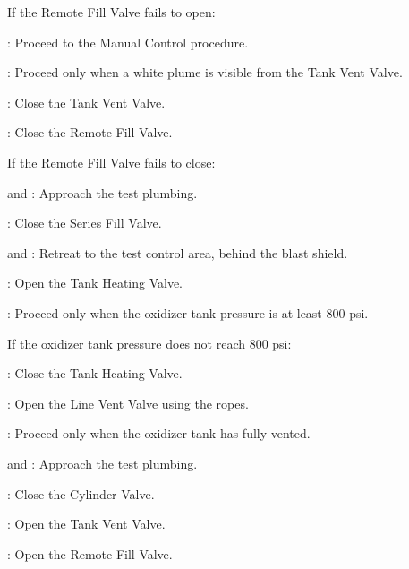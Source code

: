 \begin{checklist}
\begin{checklist}[label=$\bullet$]
\begin{checklist}
        \end{checklist}
        \item If the Remote Fill Valve fails to open:
        \begin{checklist}
            \item \ops{}: Proceed to the Manual Control procedure.
        \end{checklist}
    \end{checklist}
    \item \secondary{}: Proceed only when a white plume is visible from the Tank Vent Valve.
    \item \primary{}: Close the Tank Vent Valve.
    \item \primary{}: Close the Remote Fill Valve.
    \begin{checklist}[label=$\bullet$]
        \item If the Remote Fill Valve fails to close:
        \begin{checklist}
            \item \primary{} and \secondary: Approach the test plumbing.
            \item \primary{}: Close the Series Fill Valve.
            \item \primary{} and \secondary: Retreat to the test control area, behind the blast shield.
        \end{checklist}
    \end{checklist}
    \item \heat: Open the Tank Heating Valve.
    \item \daq{}: Proceed only when the oxidizer tank pressure is at least 800 psi.
    \begin{checklist}[label=$\bullet$]
        \item If the oxidizer tank pressure does not reach 800 psi:
        \begin{checklist}
            \item \heat: Close the Tank Heating Valve.
            \item \primary{}: Open the Line Vent Valve using the ropes.
            \item \secondary: Proceed only when the oxidizer tank has fully vented.
            \item \primary{} and \secondary: Approach the test plumbing.
            \item \primary{}: Close the Cylinder Valve.
            \item \primary{}: Open the Tank Vent Valve.
            \item \primary{}: Open the Remote Fill Valve.

\end{checklist}
\end{checklist}
\end{checklist}

